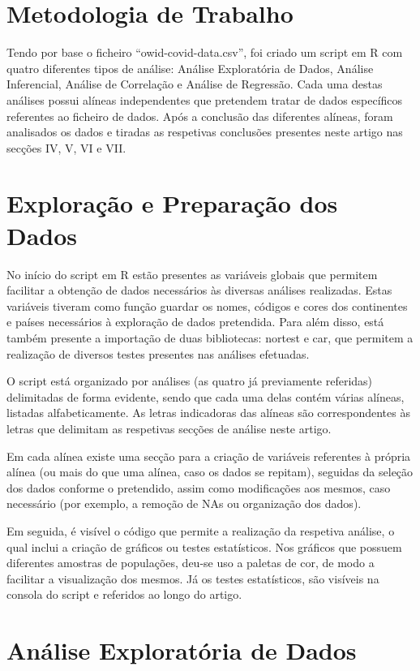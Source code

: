 \documentclass[conference]{IEEEtran}
\begin{document}
\section{Metodologia de Trabalho}
Tendo por base o ficheiro “owid-covid-data.csv”\cite{dataFile}, foi criado um script em R com quatro diferentes tipos de análise: Análise Exploratória de Dados, Análise Inferencial, Análise de Correlação e Análise de Regressão. Cada uma destas análises possui alíneas independentes que pretendem tratar de dados específicos referentes ao ficheiro de dados. Após a conclusão das diferentes alíneas, foram analisados os dados e tiradas as respetivas conclusões presentes neste artigo nas secções IV, V, VI e VII.

\section{Exploração e Preparação dos Dados}
No início do script em R estão presentes as variáveis globais que permitem facilitar a obtenção de dados necessários às diversas análises realizadas. Estas variáveis tiveram como função guardar os nomes, códigos e cores dos continentes e países necessários à exploração de dados pretendida. Para além disso, está também presente a importação de duas bibliotecas: nortest\cite{nortest} e car\cite{car}, que permitem a realização de diversos testes presentes nas análises efetuadas. 

O script está organizado por análises (as quatro já previamente referidas) delimitadas de forma evidente, sendo que cada uma delas contém várias alíneas, listadas alfabeticamente. As letras indicadoras das alíneas são correspondentes às letras que delimitam as respetivas secções de análise neste artigo.

Em cada alínea existe uma secção para a criação de variáveis referentes à própria alínea (ou mais do que uma alínea, caso os dados se repitam), seguidas da seleção dos dados conforme o pretendido, assim como modificações aos mesmos, caso necessário (por exemplo, a remoção de NAs ou organização dos dados). 

Em seguida, é visível o código que permite a realização da respetiva análise, o qual inclui a criação de gráficos ou testes estatísticos. Nos gráficos que possuem diferentes amostras de populações, deu-se uso a paletas de cor, de modo a facilitar a visualização dos mesmos. Já os testes estatísticos, são visíveis na consola do script e referidos ao longo do artigo.


\section{Análise Exploratória de Dados} %
\end{document}
